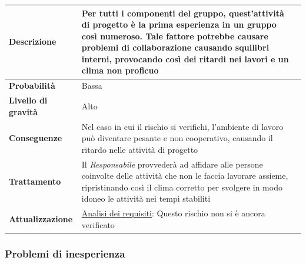\begin{center}
	
	\begin{tabular}{|>{\centering}m{4cm} ||>{\centering}m{8cm} |>{\centering\arraybackslash}m{0pt}@{}|}
		\hline
		\textbf{Descrizione} & Per tutti i componenti del gruppo,
		quest’attività di progetto è la prima esperienza in un gruppo
		così numeroso. Tale fattore potrebbe causare problemi di
		collaborazione causando squilibri interni, provocando così dei
		ritardi nei lavori e un clima non proficuo & \\[2ex]
		\hline	
		\textbf{Probabilità} & Bassa &\\[1ex]
		\hline
		\textbf{Livello di gravità} & Alto & \\[1ex]
		\hline
		\textbf{Conseguenze} & Nel caso in cui il rischio si verifichi, l’ambiente di lavoro può diventare pesante e non cooperativo, causando il ritardo nelle attività di progetto & \\[1ex]
		\hline
		\textbf{Trattamento} & Il \emph{Responsabile}  provvederà ad affidare
		alle persone coinvolte delle attività che non le faccia
		lavorare assieme, ripristinando così il clima corretto per
		svolgere in modo idoneo le attività nei tempi stabiliti & \\[1ex] 
		\hline
		\textbf{Attualizzazione} & \underline{Analisi dei requisiti}: Questo rischio non si è ancora verificato & \\[1ex]
		\hline
	\end{tabular}
	
\end{center}

\subsubsection{Problemi di inesperienza}

